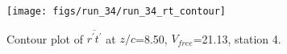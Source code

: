 \begin{figure}[H]
\centering
\texttt{[image: figs/run\_34/run\_34\_rt\_contour]}
\caption{Contour plot of $\overline{r^\prime t^\prime}$ at $z/c$=8.50, $V_{free}$=21.13, station 4.}
\label{fig:run_34_rt_contour}
\end{figure}


